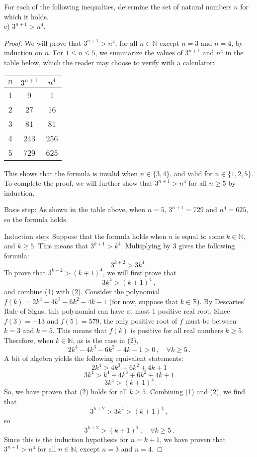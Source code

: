 \documentclass[10pt,letterpaper]{article}
\newcommand{\N}{\mathbb{N}}
\newcommand{\R}{\mathbb{R}}
\newenvironment{problem}[2][Problem]{\begin{trivlist}
\item[\hskip \labelsep {\bfseries #1}\hskip \labelsep {\bfseries #2.}]}{\end{trivlist}}
\begin{document}
\begin{problem}{3.49.c}
For each of the following inequalties, determine the set of natural numbers $n$ for which it holds.\\
c) $3^{n+1}>n^4$. 
\end{problem}

\begin{proof}
We will prove that $3^{n+1}>n^4$, for all $n \in \N$ except $n=3$ and $n=4$, by induction on $n$. For $1 \leq n \leq 5$, we summarize the values of $3^{n+1}$ and $n^4$ in the table below, which the reader may choose to verify with a calculator:

\begin{center}
\begin{tabular}{c|cc}	
 $n$ & $3^{n+1}$ & $n^4$ \\
 \hline
 1 & 9 & 1\\
 2 & 27 & 16 \\
 3 & 81 & 81 \\
 4 & 243 & 256 \\ 
 5 & 729 & 625 \\
\end{tabular}
\end{center}
This shows that the formula is invalid when $n \in \{3,4\}$, and valid for $n \in \{1,2,5\}$. To complete the proof, we will further show that $3^{n+1}>n^4$ for all $n \geq 5$ by induction. 

Basis step: As shown in the table above, when $n=5$, $3^{n+1}=729$ and $n^4=625$, so the formula holds.

Induction step: Suppose that the formula holds when $n$ is equal to some $k \in \N$, and $k \geq 5$. This means that $3^{k+1}>k^4$. Multiplying by 3 gives the following formula:
\begin{equation}
3^{k+2}>3k^4\, .
\end{equation}
To prove that $3^{k+2}>(k+1)^4$, we will first prove that 
\begin{equation}
3k^4>(k+1)^4 \, ,
\end{equation}
and combine (1) with (2). Consider the polynomial $f(k) = 2k^4-4k^3-6k^2-4k-1$ (for now, suppose that $k \in \R$). By Descartes' Rule of Signs, this polynomial can have at most 1 positive real root. Since $f(3) = -13$ and $f(5) = 579$, the only positive root of $f$ must be between $k=3$ and $k=5$. This means that $f(k)$ is positive for all real numbers $k \geq 5$. Therefore, when $k \in \N$, as is the case in (2),
$$2k^4-4k^3-6k^2-4k-1>0 \, , \quad \forall k \geq 5 \, .$$
A bit of algebra yields the following equivalent statements:
$$2k^4>4k^3+6k^2+4k+1$$
$$3k^4>k^4+4k^3+6k^2+4k+1$$
$$3k^4>(k+1)^4$$
So, we have proven that (2) holds for all $k \geq 5$. Combining (1) and (2), we find that 
$$3^{k+2}>3k^4>(k+1)^4 \, ,$$
so 
$$3^{k+2}>(k+1)^4 \, , \quad \forall k \geq 5 \, .$$
Since this is the induction hypothesis for $n=k+1$, we have proven that $3^{n+1}>n^4$ for all $n \in \N$, except $n=3$ and $n=4$. 
\end{proof}
\pagebreak
\end{document}

